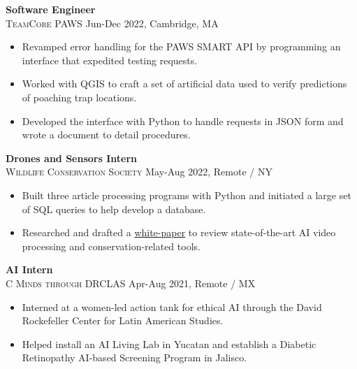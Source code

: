 \documentclass[11pt]{article}
\begin{document}
    \noindent \textbf{Software Engineer}\\
    \textsc{{TeamCore PAWS}} \hfill Jun-Dec 2022, Cambridge, MA
    \begin{itemize}[itemsep=-.4em, leftmargin=1em]\vspace{-2mm}
      \item Revamped error handling for the PAWS SMART API by programming an interface that expedited testing requests. 
      \item Worked with QGIS to craft a set of artificial data used to verify predictions of poaching trap locations.
      \item Developed the interface with Python to handle requests in JSON form and wrote a document to detail procedures.
    \end{itemize}
    
    \noindent \textbf{Drones and Sensors Intern}\\
    \textsc{{Wildlife Conservation Society}} \hfill May-Aug 2022, Remote / NY
    \begin{itemize}[itemsep=-.4em, leftmargin=1em]\vspace{-2mm}
      \item Built three article processing programs with Python and initiated a large set of SQL queries to help develop a database.
      \item Researched and drafted a 
      \href{https://bit.ly/AI-Advancing-Video-Processing-and-CTDS}{white-paper} to review state-of-the-art AI video processing and conservation-related tools.
    \end{itemize}

    \noindent \textbf{AI Intern}\\
    \textsc{{C Minds through DRCLAS}} \hfill Apr-Aug 2021, Remote / MX
    \begin{itemize}[itemsep=-.4em, leftmargin=1em]\vspace{-2mm}
      \item Interned at a women-led action tank for ethical AI through the David Rockefeller Center for Latin American Studies.
      \item Helped install an AI Living Lab in Yucatan and establish a Diabetic Retinopathy AI-based Screening Program in Jalisco. 
    \end{itemize}
\end{document}
